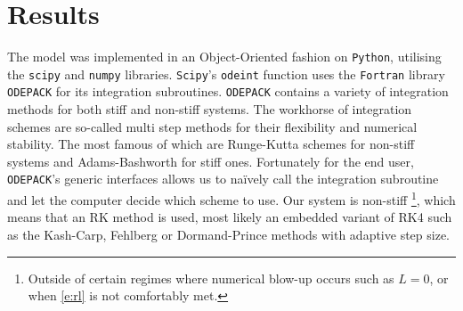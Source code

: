 \documentclass[aip,apl,reprint]{revtex4-1}
\begin{document}
	\section{Results}\label{s:results}

	The model was implemented in an Object-Oriented fashion on \texttt{Python}, utilising the \texttt{scipy} and \texttt{numpy} libraries. \texttt{Scipy}'s \texttt{odeint} function uses the \texttt{Fortran} library \texttt{ODEPACK} for its integration subroutines. \texttt{ODEPACK} contains a variety of integration methods for both stiff and non-stiff systems. The workhorse of integration schemes are so-called multi step methods for their flexibility and numerical stability. The most famous of which are Runge-Kutta schemes for non-stiff systems and Adams-Bashworth for stiff ones. Fortunately for the end user, \texttt{ODEPACK}'s generic interfaces allows us to na\"{i}vely call the integration subroutine and let the computer decide which scheme to use. Our system is non-stiff \footnote[1]{Outside of certain regimes where numerical blow-up occurs such as $L=0$, or when \cref{e:rl} is not comfortably met.}, which means that an RK method is used, most likely an embedded variant of RK4 such as the Kash-Carp, Fehlberg or Dormand-Prince methods with adaptive step size.
	
\end{document}
